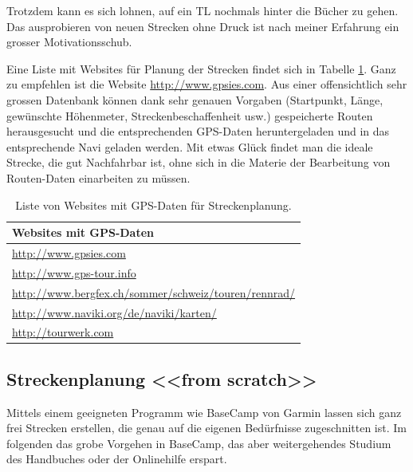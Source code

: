 \documentclass[a4paper,DIV13,BCOR0cm,draft=TRUE]{scrartcl}
\begin{document}
Trotzdem kann es sich lohnen, auf ein TL nochmals hinter die Bücher zu gehen.
Das ausprobieren von neuen Strecken ohne Druck ist nach meiner Erfahrung ein grosser Motivationsschub.

Eine Liste mit Websites für Planung der Strecken findet sich in Tabelle \ref{tab:gps-websites}.
Ganz zu empfehlen ist die Website \url{http://www.gpsies.com}. Aus einer offensichtlich
sehr grossen Datenbank können dank sehr genauen Vorgaben (Startpunkt, Länge, gewünschte Höhenmeter, 
Streckenbeschaffenheit usw.) gespeicherte Routen herausgesucht und die entsprechenden GPS-Daten
heruntergeladen und in das entsprechende Navi geladen werden. Mit etwas Glück findet man die
ideale Strecke, die gut Nachfahrbar ist, ohne sich in die Materie der Bearbeitung von 
Routen-Daten einarbeiten zu müssen.

\begin{table}
  \centering
  \begin{tabular}{l}
    \toprule
      Websites mit GPS-Daten\\
    \midrule
        \url{http://www.gpsies.com}\\
        \url{http://www.gps-tour.info}\\
        \url{http://www.bergfex.ch/sommer/schweiz/touren/rennrad/}\\
        \url{http://www.naviki.org/de/naviki/karten/}\\
        \url{http://tourwerk.com}\\
    \bottomrule
  \end{tabular}
  \caption{Liste von Websites mit GPS-Daten für Streckenplanung.}
  \label{tab:gps-websites}
\end{table}

\subsection{Streckenplanung <<from scratch>>}

Mittels einem geeigneten Programm wie BaseCamp von Garmin lassen sich ganz frei Strecken erstellen,
die genau auf die eigenen Bedürfnisse zugeschnitten ist.
Im folgenden das grobe Vorgehen in BaseCamp, das aber weitergehendes Studium des Handbuches oder
der Onlinehilfe erspart.
\end{document}

